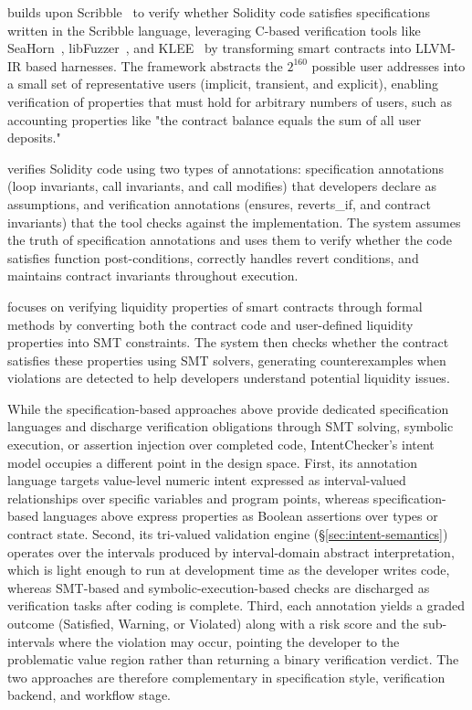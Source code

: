 \documentclass[pdflatex,sn-basic]{sn-jnl}%
\theoremstyle{thmstyleone}%
\theoremstyle{thmstyletwo}%
\theoremstyle{thmstylethree}%
\begin{document}
\citep{smartace} builds upon Scribble~\citep{scribble} to verify whether Solidity code satisfies specifications written in the Scribble language,
leveraging C-based verification tools like SeaHorn~\citep{seahorn}, libFuzzer~\citep{libfuzzer}, and KLEE~\citep{klee} by transforming smart contracts into LLVM-IR based harnesses.
The framework abstracts the $2^{160}$ possible user addresses into a small set of representative users (implicit, transient, and explicit),
enabling verification of properties that must hold for arbitrary numbers of users, such as accounting properties like
"the contract balance equals the sum of all user deposits."

\citep{idealist} verifies Solidity code using two types of annotations: specification annotations (loop invariants, call invariants, and call modifies) that developers declare as assumptions,
and verification annotations (ensures, reverts\_if, and contract invariants) that the tool checks against the implementation.
The system assumes the truth of specification annotations and uses them to verify whether the code satisfies function post-conditions,
correctly handles revert conditions, and maintains contract invariants throughout execution.

\citep{solvent} focuses on verifying liquidity properties of smart contracts through formal methods
by converting both the contract code and user-defined liquidity properties into SMT constraints.
The system then checks whether the contract satisfies these properties using SMT solvers,
generating counterexamples when violations are detected to help developers understand potential liquidity issues.

While the specification-based approaches above provide dedicated specification languages and discharge verification obligations through SMT solving, symbolic execution, or assertion injection over completed code, IntentChecker's intent model occupies a different point in the design space.
First, its annotation language targets value-level numeric intent expressed as interval-valued relationships over specific variables and program points, whereas specification-based languages above express properties as Boolean assertions over types or contract state.
Second, its tri-valued validation engine (\S\ref{sec:intent-semantics}) operates over the intervals produced by interval-domain abstract interpretation, which is light enough to run at development time as the developer writes code, whereas SMT-based and symbolic-execution-based checks are discharged as verification tasks after coding is complete.
Third, each annotation yields a graded outcome (Satisfied, Warning, or Violated) along with a risk score and the sub-intervals where the violation may occur, pointing the developer to the problematic value region rather than returning a binary verification verdict.
The two approaches are therefore complementary in specification style, verification backend, and workflow stage.
\end{document}
